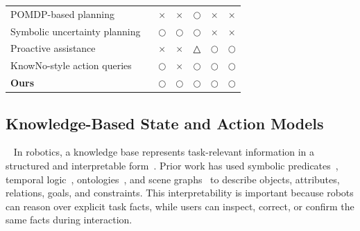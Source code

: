 \begin{table}[t]
\begin{tabularx}{\textwidth}{p{}
>{\centering\arraybackslash}X
>{\centering\arraybackslash}X
>{\centering\arraybackslash}X
>{\centering\arraybackslash}X
>{\centering\arraybackslash}X}
POMDP-based planning
~\cite{somani2013despot,bai2015intention,cramer2021probabilistic,bravo2019use,
lauri2016exploration,kim2021plgrim,vanegas2016uav,xiao2019objectsearch,
pajarinen2022composition}
& $\times$ & $\times$ & $\bigcirc$ & $\times$ & $\times$ \\

Symbolic uncertainty planning
~\cite{li2026uncertainty,sanner2010symbolic,zhang2015corpp,serrano2021knowledge,
tang2025tru}
& $\bigcirc$ & $\bigcirc$ & $\bigcirc$ & $\times$ & $\times$ \\

Proactive assistance
~\cite{singi2024decision,igbinedion2024learning,zhao2025conformalized,mangalindan2025seek,
shen2025elba,testoni2024asking}
& $\times$ & $\times$ & △ & $\bigcirc$ & $\bigcirc$ \\

KnowNo-style action queries
~\cite{ren2023robots,liang2024introspective,mullen2025lbap}
& $\bigcirc$ & $\times$ & $\bigcirc$ & $\bigcirc$ & $\bigcirc$ \\

\midrule
\textbf{Ours}
& $\bigcirc$ & $\bigcirc$ & $\bigcirc$ & $\bigcirc$ & $\bigcirc$ \\
\bottomrule
\end{tabularx}
\end{table}

\subsection{Knowledge-Based State and Action Models}~\label{rel:kb}
In robotics, a knowledge base represents task-relevant information in a structured and interpretable form~\cite{brachman2004knowledge,russell1995modern}. Prior work has used symbolic predicates~\cite{fikes1971strips,aeronautiques1998pddl}, temporal logic~\cite{liu2020graph}, ontologies~\cite{mitrevsk2021ontology}, and scene graphs~\cite{johnson2015image,armeni20193d} to describe objects, attributes, relations, goals, and constraints. This interpretability is important because robots can reason over explicit task facts, while users can inspect, correct, or confirm the same facts during interaction.


